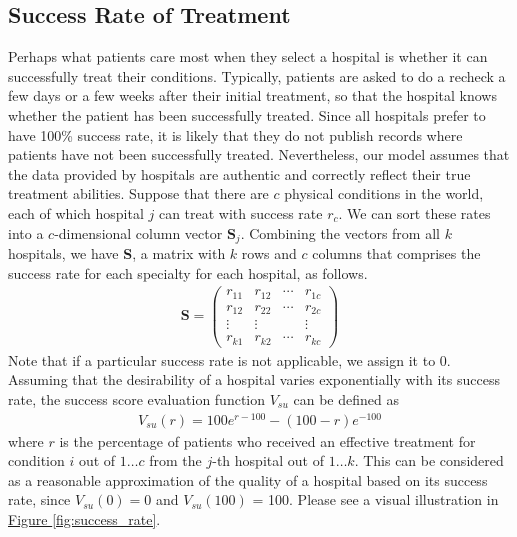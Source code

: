 \documentclass{article}
\begin{document}
\subsection{Success Rate of Treatment}
Perhaps what patients care most when they select a hospital is whether it can successfully treat their conditions. Typically, patients are asked to do a recheck a few days or a few weeks after their initial treatment, so that the hospital knows whether the patient has been successfully treated. Since all hospitals prefer to have 100\% success rate, it is likely that they do not publish records where patients have not been successfully treated. Nevertheless, our model assumes that the data provided by hospitals are authentic and correctly reflect their true treatment abilities. Suppose that there are $c$ physical conditions in the world, each of which hospital $j$ can treat with success rate $r_c$. We can sort these rates into a $c$-dimensional column vector $\mathbf{S}_j$. Combining the vectors from all $k$ hospitals, we have \textbf{S}, a matrix with $k$ rows and $c$ columns that comprises the success rate for each specialty for each hospital, as follows.
\begin{gather}
    \textbf{S} = 
    \begin{pmatrix}
    r_{11} & r_{12} & \cdots & r_{1c}\\
    r_{12} & r_{22} & \cdots & r_{2c}\\
    \vdots & \vdots & & \vdots\\
    r_{k1} & r_{k2} & \cdots & r_{kc}
    \end{pmatrix}
\end{gather}
Note that if a particular success rate is not applicable, we assign it to 0. Assuming that the desirability of a hospital varies exponentially with its success rate, the success score evaluation function $V_{su}$ can be defined as
\begin{gather}
    V_{su}\left(r\right) = 100 e^{r-100} - (100-r)e^{-100}
\end{gather}
where $r$ is the percentage of patients who received an effective treatment for condition $i$ out of $1\dots c$ from the $j$-th hospital out of $1 \dots k$. This can be considered as a reasonable approximation of the quality of a hospital based on its success rate, since $V_{su}\left(0\right) = 0$ and $V_{su}\left(100\right)$ = 100. Please see a visual illustration in \hyperref[fig:success_rate]{Figure \ref*{fig:success_rate}}.
\end{document}
